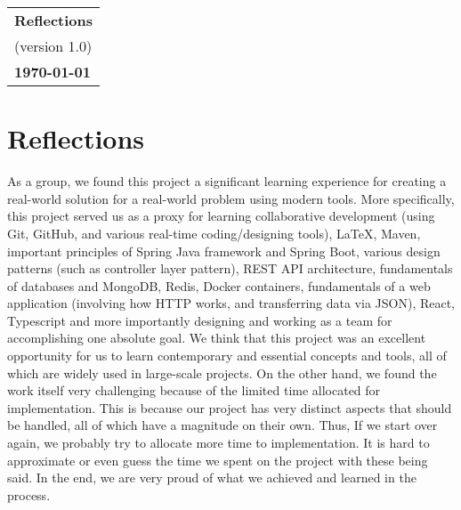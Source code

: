 \documentclass[a4paper, 12pt]{article}
\begin{document}
\begin{table}[h!]
    \renewcommand{\arraystretch}{1.5}
    \centering
    \begin{tabular}{ |>{\centering\arraybackslash}m{15.15cm}| }
        \hline
        \Large \textbf{Reflections} \\
        \small (version 1.0)        \\
        \small \textbf{\today}      \\
        \hline
    \end{tabular}
\end{table}


\section{Reflections}

As a group, we found this project a significant learning experience for creating a real-world solution for a real-world problem using 
modern tools. More specifically, this project served us as a proxy for learning collaborative development (using Git, GitHub, and 
various real-time coding/designing tools), LaTeX, Maven, important principles of Spring Java framework and Spring Boot, various design 
patterns (such as controller layer pattern), REST API architecture, fundamentals of databases and MongoDB, Redis, Docker containers, 
fundamentals of a web application (involving how HTTP works, and transferring data via JSON), React, Typescript and more importantly 
designing and working as a team for accomplishing one absolute goal. We think that this project was an excellent opportunity for us 
to learn contemporary and essential concepts and tools, all of which are widely used in large-scale projects. On the other hand, we 
found the work itself very challenging because of the limited time allocated for implementation. This is because our project has 
very distinct aspects that should be handled, all of which have a magnitude on their own. Thus, If we start over again, we 
probably try to allocate more time to implementation. It is hard to approximate or even guess the time we spent on the project 
with these being said. In the end, we are very proud of what we achieved and learned in the process.
\end{document}
